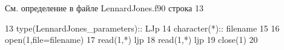 См. определение в файле Lennard\+Jones.\+f90 строка 13


\begin{DoxyCode}
13     \textcolor{keywordtype}{type}(LennardJones\_parameters):: LJp
14     \textcolor{keywordtype}{character(*)}::  filename
15     
16     \textcolor{keyword}{open}(1,file=filename)
17     \textcolor{keyword}{read}(1,*) ljp%
18     \textcolor{keyword}{read}(1,*) ljp%
19     \textcolor{keyword}{close}(1)
20     
\end{DoxyCode}
